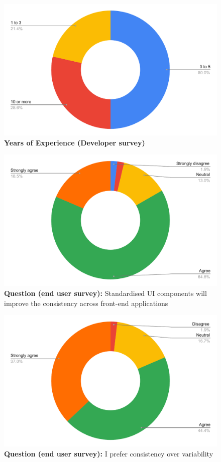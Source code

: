 \begin{figure}[H]
  \centering
  \includegraphics[width=13cm]{thesis/paper/images/p2d_experience.pdf}
  \textbf{Years of Experience (Developer survey)}
\end{figure}

\begin{figure}[H]
  \centering
  \includegraphics[width=13cm]{thesis/paper/images/p2u_q1.pdf}
  \textbf{Question (end user survey):} Standardised UI components will improve the consistency across front-end applications
\end{figure}

\begin{figure}[H]
  \centering
  \includegraphics[width=13cm]{thesis/paper/images/p2u_q2.pdf}
  \textbf{Question (end user survey):} I prefer consistency over variability
\end{figure}

